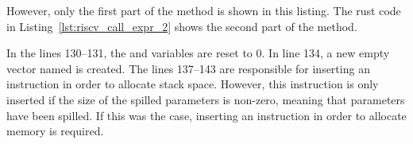 However, only the first part of the  method is shown in this listing.
The rust code in Listing~\ref{lst:riscv_call_expr_2} shows the second part of the method.


In the lines 130--131, the  and  variables are reset to 0.
In line 134, a new empty vector named  is created.
The lines 137--143 are responsible for inserting an  instruction in order to allocate stack space.
However, this instruction is only inserted if the size of the spilled parameters is non-zero,
meaning that parameters have been spilled.
If this was the case, inserting an instruction in order to allocate memory is required.

